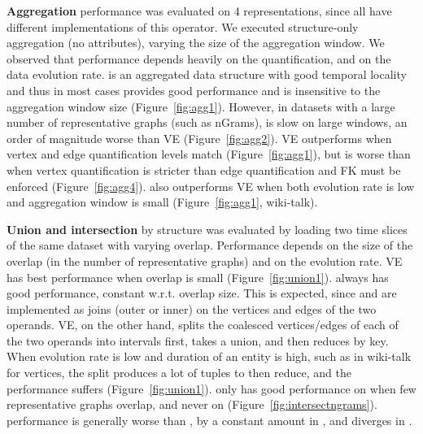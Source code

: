 {\bf Aggregation} performance was evaluated on 4 representations,
since all have different implementations of this operator.  We
executed structure-only aggregation (no attributes), varying the size
of the aggregation window.  We observed that performance depends
heavily on the quantification, and on the data evolution rate.  \og is
an aggregated data structure with good temporal locality and thus in
most cases provides good performance and is insensitive to the
aggregation window size (Figure~\ref{fig:agg1}).  However, in datasets
with a large number of representative graphs (such as nGrams), \og is
slow on large windows, an order of magnitude worse than VE
(Figure~\ref{fig:agg2}).  VE outperforms \og when vertex and edge
quantification levels match (Figure~\ref{fig:agg1}), but is worse than
\og when vertex quantification is stricter than edge quantification
and FK must be enforced (Figure~\ref{fig:agg4}).  \og also outperforms
VE when both evolution rate is low and aggregation window is small
(Figure~\ref{fig:agg1}, wiki-talk).

{\bf Union and intersection} by structure was evaluated by loading two
time slices of the same dataset with varying overlap.  Performance
depends on the size of the overlap (in the number of representative
graphs) and on the evolution rate.  VE has best performance when
overlap is small (Figure~\ref{fig:union1}).  \og always has good performance, constant
w.r.t. overlap size.  This is expected, since \og {} and
 are implemented as joins (outer or inner) on the
vertices and edges of the two operands.  VE, on the other hand, splits
the coalesced vertices/edges of each of the two operands into
intervals first, takes a union, and then reduces by key.  When
evolution rate is low and duration of an entity is high, such as in
wiki-talk for vertices, the split produces a lot of tuples to then
reduce, and the performance suffers (Figure~\ref{fig:union1}). \sg
only has good performance on  when few
representative graphs overlap, and never on 
(Figure~\ref{fig:intersectngrams}). \hg performance is generally worse
than \og, by a constant amount in , and diverges in
.

